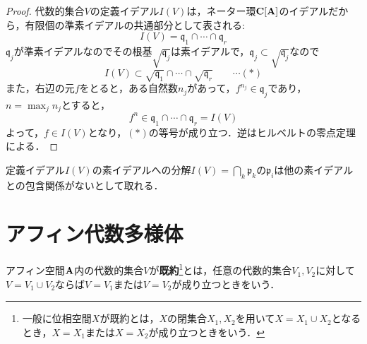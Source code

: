 \documentclass{myclass}
\begin{document}
\begin{proof}
  代数的集合$V$の定義イデアル$I(V)$は，ネーター環$\mathbf{C}[\mathbf{A}]$のイデアルだから，有限個の準素イデアルの共通部分として表される:
  \begin{equation*}
    I(V) = \mathfrak{q}_1\cap \cdots\cap \mathfrak{q}_r
  \end{equation*}
  $\mathfrak{q}_j$が準素イデアルなのでその根基$\sqrt{\mathfrak{q}_j}$は素イデアルで，$\mathfrak{q}_j\subset \sqrt{\mathfrak{q}_j}$なので
  \begin{equation*}
    I(V) \subset \sqrt{\mathfrak{q}_1}\cap \cdots \cap \sqrt{\mathfrak{q}_r}\qquad \cdots (*)
  \end{equation*}
  また，右辺の元$f$をとると，ある自然数$n_j$があって，$f^{n_j} \in \mathfrak{q}_j$であり，$n = \max_j n_j$とすると，
  \begin{equation*}
    f^n \in \mathfrak{q}_1\cap \cdots \cap \mathfrak{q}_r = I(V)
  \end{equation*}
  よって，$f\in I(V)$となり，$(*)$の等号が成り立つ．逆はヒルベルトの零点定理による．
\end{proof}

\begin{remark}
  定義イデアル$I(V)$の素イデアルへの分解$I(V) = \bigcap_k \mathfrak{p}_k$の$\mathfrak{p}_i$は他の素イデアルとの包含関係がないとして取れる． 
\end{remark}


\section{アフィン代数多様体}

\begin{definition}
  アフィン空間$\mathbf{A}$内の代数的集合$V$が\textbf{既約}\footnote{一般に位相空間$X$が既約とは，$X$の閉集合$X_1,X_2$を用いて$X=X_1\cup X_2$となるとき，$X=X_1$または$X=X_2$が成り立つときをいう．}とは，任意の代数的集合$V_1,V_2$に対して$V = V_1\cup V_2$ならば$V=V_1$または$V=V_2$が成り立つときをいう．
\end{definition}
\end{document}

